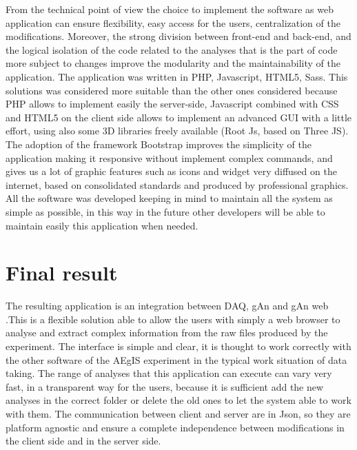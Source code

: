From the technical point of view the choice to implement the software as web application can ensure flexibility, easy access for the users, centralization of the modifications. Moreover, the strong division between front-end and back-end, and  
the logical isolation of the code related to the analyses that is the part of code more subject to changes improve the modularity and the maintainability of the application.
The application was written in PHP, Javascript, HTML5, Sass. This solutions was considered more suitable than the other ones considered because PHP allows to implement easily the server-side, Javascript combined with CSS and HTML5 on the client side allows to implement an advanced GUI with a little effort, using also some 3D libraries freely available (Root Js, based on Three JS). The adoption of the framework Bootstrap improves the simplicity of the application making it responsive without implement complex commands, and gives us a lot of graphic features such as icons and widget very diffused on the internet, based on consolidated standards and produced by professional graphics. All the software was developed keeping in mind to maintain all the system as simple as possible, in this way in the future other developers will be able to maintain easily this application when needed.

\section{Final result}

The resulting application is an integration between DAQ, gAn and gAn web .This is a flexible solution able to allow the users with simply a web browser to analyse and extract complex information from the raw files produced by the experiment. The interface is simple and clear, it is thought to work correctly with the other software of the AEgIS experiment in the typical work situation of data taking. The range of analyses that this application can execute can vary very fast, in a transparent way for the users, because it is sufficient add the new analyses in the correct folder or delete the old ones to let the system able to work with them. The communication between client and server are in Json, so they are platform agnostic and ensure a complete independence between modifications in the client side and in the server side.

